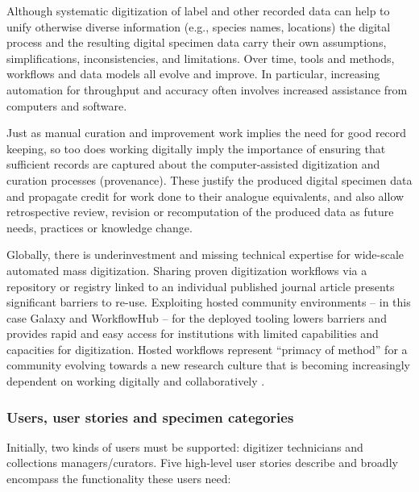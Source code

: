 Although systematic digitization of label and other recorded data can
help to unify otherwise diverse information (e.g., species names,
locations) the digital process and the resulting digital specimen data
carry their own assumptions, simplifications, inconsistencies, and
limitations. Over time, tools and methods, workflows and data models all
evolve and improve. In particular, increasing automation for throughput
and accuracy often involves increased assistance from computers and
software.

Just as manual curation and improvement work implies the need for good
record keeping, so too does working digitally imply the importance of
ensuring that sufficient records are captured about the
computer-assisted digitization and curation processes (provenance).
These justify the produced digital specimen data and propagate credit
for work done to their analogue equivalents, and also allow
retrospective review, revision or recomputation of the produced data as
future needs, practices or knowledge change.

Globally, there is underinvestment and missing technical expertise for
wide-scale automated mass digitization. Sharing proven digitization
workflows via a repository or registry linked to an individual published
journal article presents significant barriers to re-use. Exploiting
hosted community environments -- in this case Galaxy and WorkflowHub --
for the deployed tooling lowers barriers and provides rapid and easy
access for institutions with limited capabilities and capacities for
digitization. Hosted workflows represent ``primacy of method'' for a
community evolving towards a new research culture that is becoming
increasingly dependent on working digitally and collaboratively
\cite{ch8-57,ch8-58}.

\subsubsection{Users, user stories and specimen categories}\label{users-user-stories-and-specimen-categories}

Initially, two kinds of users must be supported: digitizer technicians
and collections managers/curators. Five high-level user stories describe
and broadly encompass the functionality these users need:

